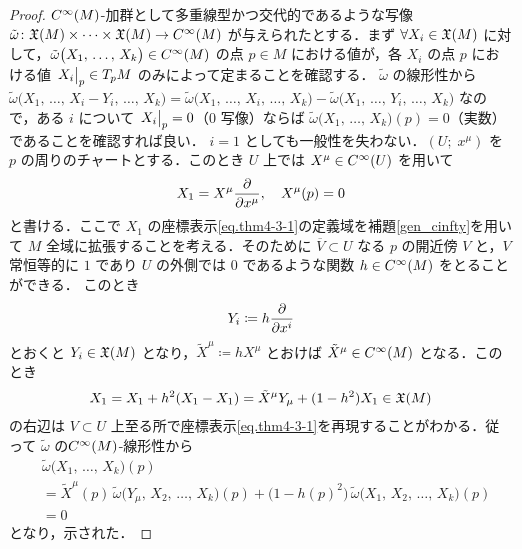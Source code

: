 \documentclass[geometry_main]{subfiles}
\begin{document}
\begin{proof} 
	$C^\infty(M)$-加群として多重線型かつ交代的であるような写像 $\tilde{\omega}\colon \mathfrak{X}(M) \times \cdots \times \mathfrak{X}(M) \to C^\infty(M)$ が与えられたとする．まず $\forall X_i \in \mathfrak{X}(M)$ に対して，$\tilde{\omega}\bigl( X_1,\, \dots ,\, X_k \bigr) \in C^\infty(M)$ の点 $p \in M$ における値が，各 $X_i$ の点 $p$ における値 $\eval{X_i}_p \in T_p M$ のみによって定まることを確認する．
	$\tilde{\omega}$ の線形性から $\tilde{\omega}\bigl( X_1,\, \dots ,\, X_i - Y_i,\, \dots,\, X_k \bigr) = \tilde{\omega}\bigl( X_1,\, \dots ,\, X_i ,\, \dots,\, X_k \bigr) - \tilde{\omega}\bigl( X_1,\, \dots ,\, Y_i ,\, \dots,\, X_k \bigr)$ なので，ある $i$ について $\eval{X_i}_p = 0$（$0$ 写像）ならば $\tilde{\omega}\bigl( X_1,\, \dots ,\, X_k \bigr)(p) = 0$（実数）であることを確認すれば良い．
	$i = 1$ としても一般性を失わない．$(U;\; x^\mu)$ を $p$ の周りのチャートとする．このとき $U$ 上では $X^\mu \in C^\infty(U)$ を用いて
	\begin{align} 
		\label{eq.thm4-3-1}
		X_1 = X^\mu \pdv{}{x^\mu},\quad X^\mu(p) = 0
	\end{align}
	と書ける．ここで $X_1$ の座標表示\eqref{eq.thm4-3-1}の定義域を補題\ref{gen_cinfty}を用いて $M$ 全域に拡張することを考える．そのために $\overline{V} \subset U$ なる $p$ の開近傍 $V$ と，$V$ 常恒等的に $1$ であり $U$ の外側では $0$ であるような\cinfty 関数 $h \in C^\infty(M)$ をとることができる．
	このとき 
	\begin{align} 
		Y_i \coloneqq h \pdv{}{x^i}
	\end{align} 
	とおくと $Y_i \in \mathfrak{X}(M)$ となり，$\tilde{X}^\mu \coloneqq h X^\mu$ とおけば $\tilde{X}^\mu \in C^\infty(M)$ となる．このとき
	\begin{align} 
		X_1 = X_1 + h^2(X_1 - X_1) = \tilde{X}^\mu Y_\mu + (1 - h^2) X_1 \in \mathfrak{X}(M)
	\end{align}
	の右辺は $V \subset U$ 上至る所で座標表示\eqref{eq.thm4-3-1}を再現することがわかる．従って $\tilde{\omega}$ の$C^\infty(M)$-線形性から
	\begin{align} 
		&\tilde{\omega}\bigl( X_1,\, \dots ,\, X_k \bigr)(p) \\
		&= \tilde{X}^\mu (p)\, \tilde{\omega}\bigl(Y_\mu,\, X_2,\, \dots ,\, X_k \bigr)(p) + \bigl( 1 - h(p)^2 \bigr)\, \tilde{\omega}\bigl(X_1,\, X_2,\, \dots ,\, X_k \bigr)(p) \\
		&= 0
	\end{align}
	となり，示された．


\end{proof}
\end{document}
